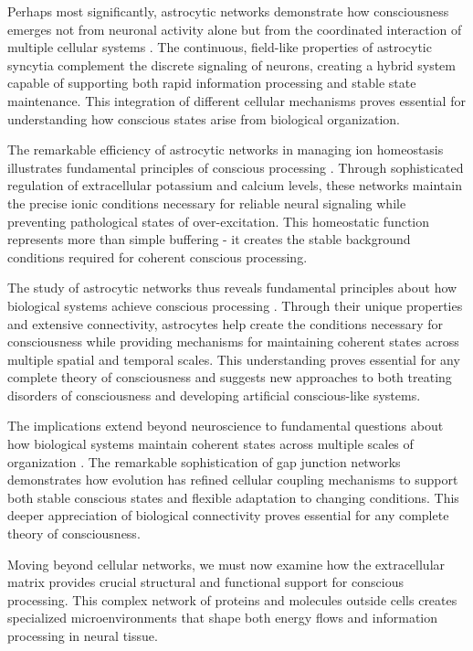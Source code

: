 \begin{refsection}
Perhaps most significantly, astrocytic networks demonstrate how consciousness emerges not from neuronal activity alone but from the coordinated interaction of multiple cellular systems \cite{Nedergaard2003}. The continuous, field-like properties of astrocytic syncytia complement the discrete signaling of neurons, creating a hybrid system capable of supporting both rapid information processing and stable state maintenance. This integration of different cellular mechanisms proves essential for understanding how conscious states arise from biological organization.

The remarkable efficiency of astrocytic networks in managing ion homeostasis illustrates fundamental principles of conscious processing \cite{Bellot-Saez2017}. Through sophisticated regulation of extracellular potassium and calcium levels, these networks maintain the precise ionic conditions necessary for reliable neural signaling while preventing pathological states of over-excitation. This homeostatic function represents more than simple buffering - it creates the stable background conditions required for coherent conscious processing.

The study of astrocytic networks thus reveals fundamental principles about how biological systems achieve conscious processing \cite{Giaume2010}. Through their unique properties and extensive connectivity, astrocytes help create the conditions necessary for consciousness while providing mechanisms for maintaining coherent states across multiple spatial and temporal scales. This understanding proves essential for any complete theory of consciousness and suggests new approaches to both treating disorders of consciousness and developing artificial conscious-like systems.

The implications extend beyond neuroscience to fundamental questions about how biological systems maintain coherent states across multiple scales of organization \cite{Khakh2015}. The remarkable sophistication of gap junction networks demonstrates how evolution has refined cellular coupling mechanisms to support both stable conscious states and flexible adaptation to changing conditions. This deeper appreciation of biological connectivity proves essential for any complete theory of consciousness.

Moving beyond cellular networks, we must now examine how the extracellular matrix provides crucial structural and functional support for conscious processing. This complex network of proteins and molecules outside cells creates specialized microenvironments that shape both energy flows and information processing in neural tissue.


\end{refsection}
